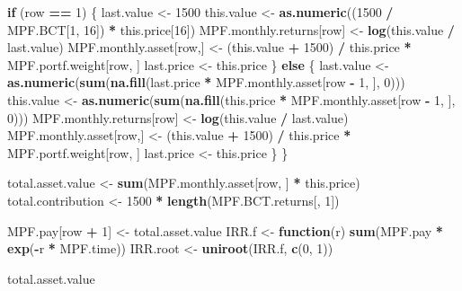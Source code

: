 \documentclass[]{article}
\newenvironment{Shaded}{\begin{snugshade}}{\end{snugshade}}
\newcommand{\ControlFlowTok}[1]{\textcolor[rgb]{0.13,0.29,0.53}{\textbf{#1}}}
\newcommand{\DecValTok}[1]{\textcolor[rgb]{0.00,0.00,0.81}{#1}}
\newcommand{\KeywordTok}[1]{\textcolor[rgb]{0.13,0.29,0.53}{\textbf{#1}}}
\newcommand{\NormalTok}[1]{#1}
\newcommand{\OperatorTok}[1]{\textcolor[rgb]{0.81,0.36,0.00}{\textbf{#1}}}
\newcommand{\StringTok}[1]{\textcolor[rgb]{0.31,0.60,0.02}{#1}}
\begin{document}
\begin{Shaded}
\begin{Highlighting}[]
  \ControlFlowTok{if}\NormalTok{ (row }\OperatorTok{==}\StringTok{ }\DecValTok{1}\NormalTok{) \{}
\NormalTok{    last.value <-}\StringTok{ }\DecValTok{1500}
\NormalTok{    this.value <-}\StringTok{ }\KeywordTok{as.numeric}\NormalTok{((}\DecValTok{1500} \OperatorTok{/}\StringTok{ }\NormalTok{MPF.BCT[}\DecValTok{1}\NormalTok{, }\DecValTok{16}\NormalTok{]) }\OperatorTok{*}\StringTok{ }\NormalTok{this.price[}\DecValTok{16}\NormalTok{])}
\NormalTok{    MPF.monthly.returns[row] <-}\StringTok{ }\KeywordTok{log}\NormalTok{(this.value }\OperatorTok{/}\StringTok{ }\NormalTok{last.value)}
\NormalTok{    MPF.monthly.asset[row,] <-}
\StringTok{      }\NormalTok{(this.value }\OperatorTok{+}\StringTok{ }\DecValTok{1500}\NormalTok{) }\OperatorTok{/}\StringTok{ }\NormalTok{this.price }\OperatorTok{*}\StringTok{ }\NormalTok{MPF.portf.weight[row, ]}
\NormalTok{    last.price <-}\StringTok{ }\NormalTok{this.price}
\NormalTok{  \} }\ControlFlowTok{else}\NormalTok{ \{}
\NormalTok{    last.value <-}
\StringTok{      }\KeywordTok{as.numeric}\NormalTok{(}\KeywordTok{sum}\NormalTok{(}\KeywordTok{na.fill}\NormalTok{(last.price }\OperatorTok{*}\StringTok{ }\NormalTok{MPF.monthly.asset[row }\OperatorTok{-}\StringTok{ }\DecValTok{1}\NormalTok{, ], }\DecValTok{0}\NormalTok{)))}
\NormalTok{    this.value <-}
\StringTok{      }\KeywordTok{as.numeric}\NormalTok{(}\KeywordTok{sum}\NormalTok{(}\KeywordTok{na.fill}\NormalTok{(this.price }\OperatorTok{*}\StringTok{ }\NormalTok{MPF.monthly.asset[row }\OperatorTok{-}\StringTok{ }\DecValTok{1}\NormalTok{, ], }\DecValTok{0}\NormalTok{)))}
\NormalTok{    MPF.monthly.returns[row] <-}\StringTok{ }\KeywordTok{log}\NormalTok{(this.value }\OperatorTok{/}\StringTok{ }\NormalTok{last.value)}
\NormalTok{    MPF.monthly.asset[row,] <-}
\StringTok{      }\NormalTok{(this.value }\OperatorTok{+}\StringTok{ }\DecValTok{1500}\NormalTok{) }\OperatorTok{/}\StringTok{ }\NormalTok{this.price }\OperatorTok{*}\StringTok{ }\NormalTok{MPF.portf.weight[row, ]}
\NormalTok{    last.price <-}\StringTok{ }\NormalTok{this.price}
\NormalTok{  \}}
\NormalTok{\}}


\NormalTok{total.asset.value <-}\StringTok{ }\KeywordTok{sum}\NormalTok{(MPF.monthly.asset[row, ] }\OperatorTok{*}\StringTok{ }\NormalTok{this.price)}
\NormalTok{total.contribution <-}\StringTok{ }\DecValTok{1500} \OperatorTok{*}\StringTok{ }\KeywordTok{length}\NormalTok{(MPF.BCT.returns[, }\DecValTok{1}\NormalTok{])}

\NormalTok{MPF.pay[row }\OperatorTok{+}\StringTok{ }\DecValTok{1}\NormalTok{] <-}\StringTok{ }\NormalTok{total.asset.value}
\NormalTok{IRR.f <-}\StringTok{ }\ControlFlowTok{function}\NormalTok{(r)}
  \KeywordTok{sum}\NormalTok{(MPF.pay }\OperatorTok{*}\StringTok{ }\KeywordTok{exp}\NormalTok{(}\OperatorTok{-}\NormalTok{r }\OperatorTok{*}\StringTok{ }\NormalTok{MPF.time))}
\NormalTok{IRR.root <-}\StringTok{ }\KeywordTok{uniroot}\NormalTok{(IRR.f, }\KeywordTok{c}\NormalTok{(}\DecValTok{0}\NormalTok{, }\DecValTok{1}\NormalTok{))}


\NormalTok{total.asset.value}
\end{Highlighting}
\end{Shaded}
\end{document}
